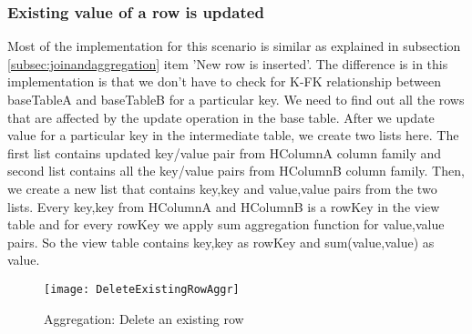\documentclass[11pt,a4paper,bibtotoc,idxtotoc,headsepline,footsepline,footexclude,BCOR12mm,DIV13]{scrbook}
\begin{document}
\subsubsection{Existing value of a row is updated}


Most of the implementation for this scenario is similar as explained in subsection \ref{subsec:joinandaggregation} item 'New row is inserted'. The difference is in this implementation is that we don't have to check for K-FK relationship between baseTableA and baseTableB for a particular key. We need to find out all the rows that are affected by the update operation in the base table. After we update value for a particular key in the intermediate table, we create two lists here. The first list contains updated key/value pair from HColumnA column family and second list contains all the key/value pairs from HColumnB column family. Then, we create a new list that contains key,key and value,value pairs from the two lists. Every key,key from HColumnA and HColumnB is a rowKey in the view table and for every rowKey we apply sum aggregation function for value,value pairs. So the view table contains key,key as rowKey and sum(value,value) as value.


\begin{figure}
    \centering
    \texttt{[image: DeleteExistingRowAggr]}
    \caption{Aggregation: Delete an existing row}
    \label{sec:deleteexistingrow}
    
\end{figure} 
\end{document}
